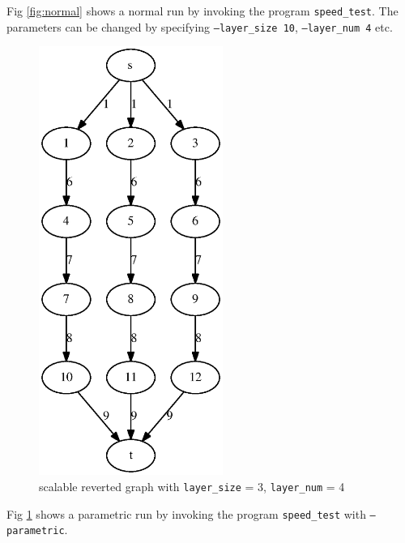 \documentclass{article}
\begin{document}
Fig \ref{fig:normal} shows a normal run by invoking the program \texttt{speed\_test}. The parameters can be changed by specifying \texttt{--layer\_size 10}, \texttt{--layer\_num 4} etc.
\begin{figure}[!ht]
\centering
\includegraphics[width=6cm]{fig/reverted.eps}
\caption{scalable reverted graph with \texttt{layer\_size} = 3, \texttt{layer\_num} = 4}\label{fig:reverted}
\end{figure}
Fig \ref{fig:reverted} shows a parametric run by invoking the program \texttt{speed\_test} with \texttt{--parametric}.
\end{document}
